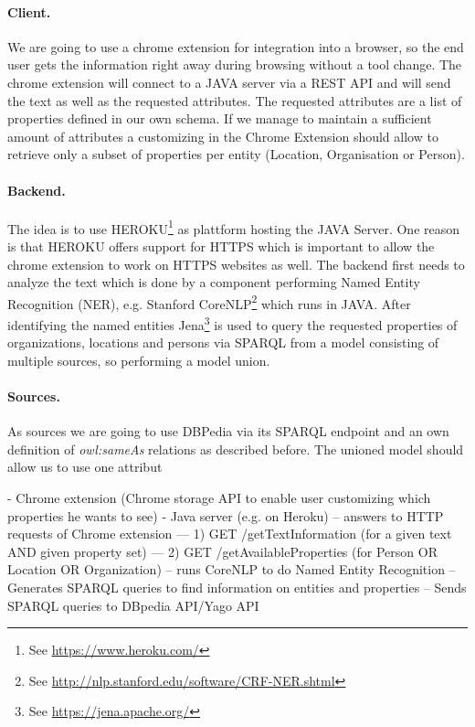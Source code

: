 \documentclass[11pt,titlepage,oneside,openany]{article}
\begin{document}
\paragraph{Client.}
We are going to use a chrome extension for integration into a browser, so the end user gets the information right away during browsing without a tool change. The chrome extension will connect to a JAVA server via a REST API and will send the text as well as the requested attributes. The requested attributes are a list of properties defined in our own schema. If we manage to maintain a sufficient amount of attributes a customizing in the Chrome Extension should allow to retrieve only a subset of properties per entity (Location, Organisation or Person). 

\paragraph{Backend.}
The idea is to use HEROKU\footnote{See \url{https://www.heroku.com/}} as plattform hosting the JAVA Server. One reason is that HEROKU offers support for HTTPS which is important to allow the chrome extension to work on HTTPS websites as well.
The backend first needs to analyze the text which is done by a component performing Named Entity Recognition (NER), e.g. Stanford CoreNLP\footnote{See \url{http://nlp.stanford.edu/software/CRF-NER.shtml}} which runs in JAVA. After identifying the named entities Jena\footnote{See \url{https://jena.apache.org/}} is used to query the requested properties of organizations, locations and persons via SPARQL from a model consisting of multiple sources, so performing a model union. 

\paragraph{Sources.}
As sources we are going to use DBPedia via its SPARQL endpoint and an own definition of \textit{owl:sameAs} relations as described before. The unioned model should allow us to use one attribut


- Chrome extension (Chrome storage API to enable user customizing which
properties he wants to see)
- Java server (e.g. on Heroku)
-- answers to HTTP requests of Chrome extension
--- 1) GET /getTextInformation (for a given text AND given property set)
--- 2) GET /getAvailableProperties (for Person OR Location OR Organization)
-- runs CoreNLP to do Named Entity Recognition
-- Generates SPARQL queries to find information on entities and properties
-- Sends SPARQL queries to DBpedia API/Yago API
\end{document}
